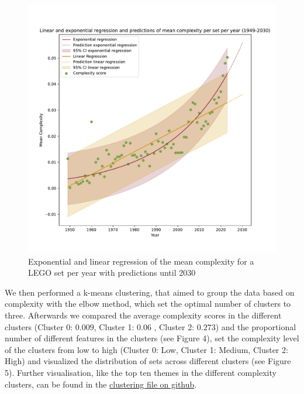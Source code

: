 \documentclass{article}
\theoremstyle{plain}
\theoremstyle{definition}
\theoremstyle{remark}
\begin{document}
\begin{figure}[ht]
 \vskip 0.2in
 \begin{center}
 \centerline{\includegraphics[width=\columnwidth]{../Images/Regressions.pdf}}
\caption{Exponential and linear regression of the mean complexity for a LEGO set per year with predictions until 2030}
\label{icml-historical}
 \end{center}
 \vskip -0.2in
\end{figure}

We then performed a k-means clustering, that aimed to group the data based on complexity with the elbow method, which set the optimal number of clusters to three. Afterwards we compared the average complexity scores in the different clusters (Cluster 0: $0.009$, Cluster 1: $0.06$ , Cluster 2: $0.273$) and the proportional number of different features in the clusters (see Figure 4), set the complexity level of the clusters from low to high (Cluster 0: Low, Cluster 1: Medium, Cluster 2: High) and visualized the distribution of sets across different clusters (see Figure 5). Further visualisation, like the top ten themes in the different complexity clusters, can be found in the \href{https://github.com/eddiebeach99/Data_Literacy/blob/main/Analysis/clustering.ipynb}{clustering file on github}.
\end{document}
